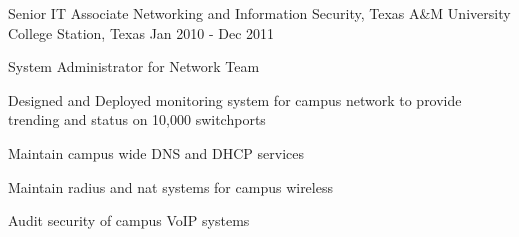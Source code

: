 \begin{cventries}
  \cventry
    {Senior IT Associate} %
    {Networking and Information Security, Texas A\&M University} %
    {College Station, Texas} %
    {Jan 2010 - Dec 2011} %
    {
      \begin{cvitems} %
        \item {System Administrator for Network Team}
        \item {Designed and Deployed monitoring system for campus network to provide trending and status on 10,000 switchports}
        \item {Maintain campus wide DNS and DHCP services}
        \item {Maintain radius and nat systems for campus wireless}
        \item {Audit security of campus VoIP systems}
      \end{cvitems}
    }

\end{cventries}
